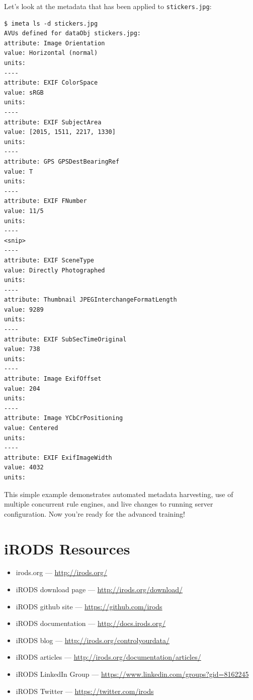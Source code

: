\documentclass[10pt,oneside]{memoir}
\begin{document}
\newpage

Let's look at the metadata that has been applied to \texttt{stickers.jpg}:

\begin{lstlisting}
$ imeta ls -d stickers.jpg
AVUs defined for dataObj stickers.jpg:
attribute: Image Orientation
value: Horizontal (normal)
units:
----
attribute: EXIF ColorSpace
value: sRGB
units:
----
attribute: EXIF SubjectArea
value: [2015, 1511, 2217, 1330]
units:
----
attribute: GPS GPSDestBearingRef
value: T
units:
----
attribute: EXIF FNumber
value: 11/5
units:
----
<snip>
----
attribute: EXIF SceneType
value: Directly Photographed
units:
----
attribute: Thumbnail JPEGInterchangeFormatLength
value: 9289
units:
----
attribute: EXIF SubSecTimeOriginal
value: 738
units:
----
attribute: Image ExifOffset
value: 204
units:
----
attribute: Image YCbCrPositioning
value: Centered
units:
----
attribute: EXIF ExifImageWidth
value: 4032
units:
\end{lstlisting}


This simple example demonstrates automated metadata harvesting, use of multiple concurrent rule engines, and live changes to running server configuration.  Now you're ready for the advanced training!



\appendix

\chapter{iRODS Resources}

\begin{itemize}
 \item irods.org --- \url{http://irods.org/}
 \item iRODS download page  --- \url{http://irods.org/download/}
 \item iRODS github site ---  \url{https://github.com/irods}
 \item iRODS documentation --- \url{http://docs.irods.org/}
 \item iRODS blog --- \url{http://irods.org/controlyourdata/}
 \item iRODS articles --- \url{http://irods.org/documentation/articles/}
 \item iRODS LinkedIn Group --- \url{https://www.linkedin.com/groups?gid=8162245}
 \item iRODS Twitter --- \url{https://twitter.com/irods}
\end{itemize}
\end{document}
